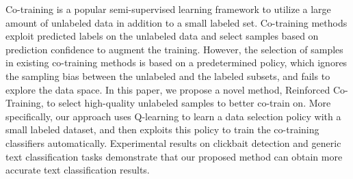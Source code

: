 Co-training is a popular semi-supervised learning framework to utilize a large amount of unlabeled data in addition to a small labeled set. Co-training methods exploit predicted labels on the unlabeled data and select samples based on prediction confidence to augment the training. However, the selection of samples in existing co-training methods is based on a predetermined policy, which ignores the sampling bias between the unlabeled and the labeled subsets, and fails to explore the data space. In this paper, we propose a novel method, Reinforced Co-Training, to select high-quality unlabeled samples to better co-train on. More specifically, our approach uses Q-learning to learn a data selection policy with a small labeled dataset, and then exploits this policy to train the co-training classifiers automatically. Experimental results on clickbait detection and generic text classification tasks demonstrate that our proposed method can obtain more accurate text classification results.
